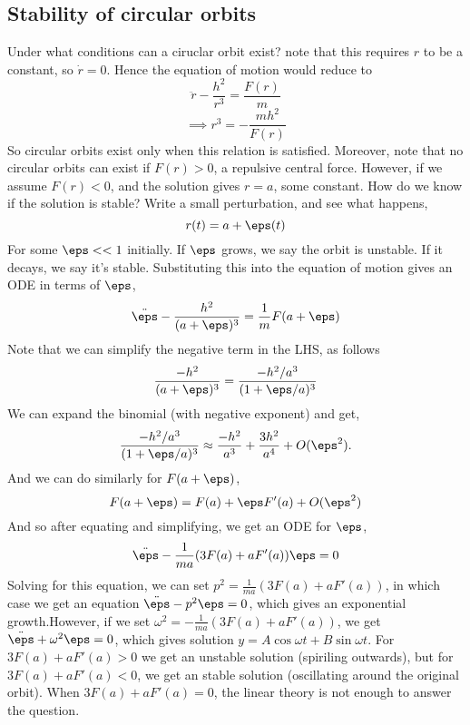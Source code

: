 \subsection{Stability of circular orbits}
Under what conditions can a ciruclar orbit exist? note that this requires $r$ to
be a constant, so $\dot{r}=0$. Hence the equation of motion would reduce to 
\[\ddot{r}-\frac{h^2}{r^3}= \frac{F(r)}{m} \]
\[\implies r^3 = - \frac{mh^2}{F(r)}\]
So circular orbits exist only when this relation is satisfied. Moreover, note
that no circular orbits can exist if $F(r)>0$, a repulsive central force.
However, if we assume $F(r)<0$, and the solution gives $r=a$, some constant. How
do we know if the solution is stable? Write a small perturbation, and see what
happens,
\[r(t) = a + \eps(t)\]
For some $\eps<<1$ initially. If $\eps$ grows, we say the orbit is unstable. If
it decays, we say it's stable. Substituting this into the equation of motion
gives an ODE in terms of $\eps$,
\[\ddot{\eps} - \frac{h^2}{(a+\eps)^3} = \frac{1}{m}F(a+\eps)\]
Note that we can simplify the negative term in the LHS, as follows
\[\frac{-h^2}{(a+\eps)^3} = \frac{-h^2/a^3}{(1+\eps/a)^3}\]
We can expand the binomial (with negative exponent) and get,
\[\frac{-h^2/a^3}{(1+\eps/a)^3}\approx
\frac{-h^2}{a^3}+\frac{3h^2}{a^4}+O(\eps^2).\]
And we can do similarly for $F(a+\eps)$,
\[F(a+\eps) = F(a) +\eps F'(a)+ O(\eps^2)\]
And so after equating and simplifying, we get an ODE for $\eps$, 
\[\ddot{\eps} -\frac{1}{ma}(3F(a)+aF'(a))\eps=0\]
Solving for this equation, we can set $p^2=\frac{1}{ma}(3F(a)+aF'(a))$, in which
case we get an equation $\ddot{\eps}-p^2\eps =0$, which gives an exponential
growth.However, if we set $\omega^2=-\frac{1}{ma}(3F(a)+aF'(a))$, we get
$\ddot{\eps}+\omega^2\eps=0$, which gives solution $y=A\cos\omega t +
B\sin\omega t$. For $3F(a)+aF'(a)>0$ we get an unstable solution (spiriling
outwards), but for $3F(a)+aF'(a)<0$, we get an stable solution (oscillating
around the original orbit). When $3F(a)+aF'(a)=0$, the linear theory is not
enough to answer the question.
